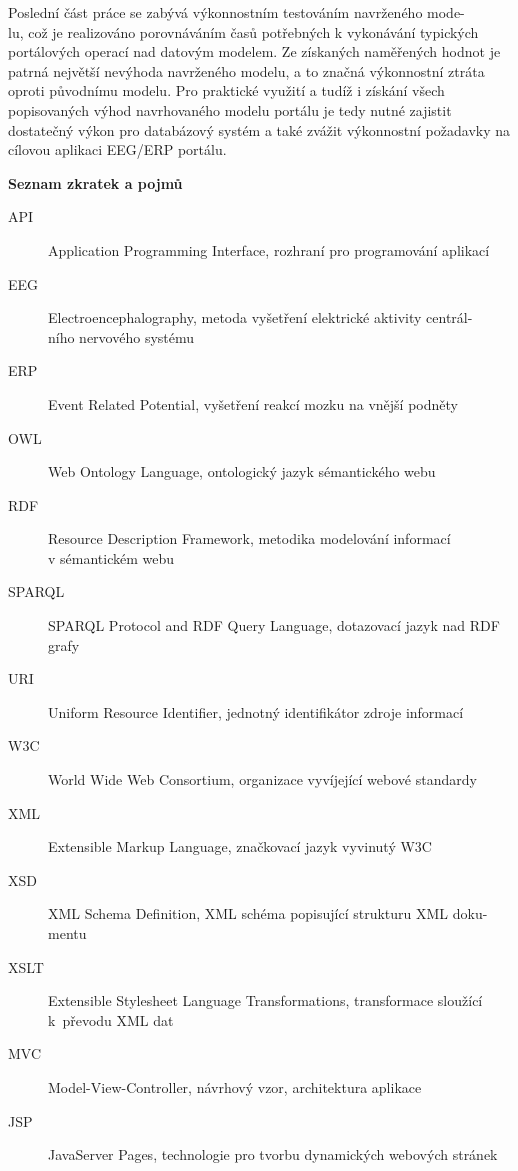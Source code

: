 \documentclass{projekt}
\begin{document}
Poslední část práce se zabývá výkonnostním testováním navrženého mode-\\lu, což je realizováno porovnáváním časů potřebných k vykonávání typických portálových operací nad datovým modelem. Ze získaných naměřených hodnot je patrná největší nevýhoda navrženého modelu, a to značná výkonnostní ztráta oproti původnímu modelu. Pro praktické využití a tudíž i získání všech popisovaných výhod navrhovaného modelu portálu je tedy nutné zajistit dostatečný výkon pro databázový systém a také zvážit výkonnostní požadavky na cílovou aplikaci EEG/ERP portálu.






\newpage
\thispagestyle{plain}
\noindent
{\bf \LARGE Seznam zkratek a pojmů}\\

\noindent
\begin{description}
\item[API] Application Programming Interface, rozhraní pro programování aplikací
\item[EEG] Electroencephalography, metoda vyšetření elektrické aktivity centrál-\\ního nervového
systému
\item[ERP] Event Related Potential, vyšetření reakcí mozku na vnější podněty
\item[OWL] Web Ontology Language, ontologický jazyk sémantického webu
\item[RDF] Resource Description Framework, metodika modelování informací \\v sémantickém webu
\item[SPARQL] SPARQL Protocol and RDF Query Language, dotazovací jazyk nad RDF grafy
\item[URI] Uniform Resource Identifier, jednotný identifikátor zdroje informací
\item[W3C] World Wide Web Consortium, organizace vyvíjející webové standardy
\item[XML] Extensible Markup Language, značkovací jazyk vyvinutý W3C
\item[XSD] XML Schema Definition, XML schéma popisující strukturu XML doku-\\mentu
\item[XSLT] Extensible Stylesheet Language Transformations, transformace sloužící k~převodu XML dat
\item[MVC] Model-View-Controller, návrhový vzor, architektura aplikace
\item[JSP] JavaServer Pages, technologie pro tvorbu dynamických webových stránek
\end{description}
\end{document}
